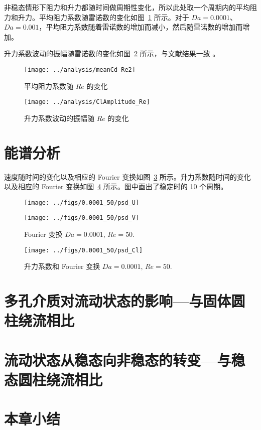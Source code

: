 非稳态情形下阻力和升力都随时间做周期性变化，所以此处取一个周期内的平均阻力和升力。平均阻力系数随雷诺数的变化如图~\ref{fig: meanCd} 所示。对于 $Da=0.0001$、$Da=0.001$，平均阻力系数随着雷诺数的增加而减小，然后随雷诺数的增加而增加。

升力系数波动的振幅随雷诺数的变化如图~\ref{fig: ClAmplitude} 所示，与文献结果一致 \cite{Park1998}。

\begin{figure}
	\centering
	\texttt{[image: ../analysis/meanCd\_Re2]}
	\caption{平均阻力系数随 $Re$ 的变化}
	\label{fig: meanCd}
\end{figure}

\begin{figure}
	\centering
	\texttt{[image: ../analysis/ClAmplitude\_Re]}
	\caption{升力系数波动的振幅随 $Re$ 的变化}
	\label{fig: ClAmplitude}
\end{figure}

\section{能谱分析} %

速度随时间的变化以及相应的 Fourier 变换如图~\ref{fig: velocity Fourier} 所示。升力系数随时间的变化以及相应的 Fourier 变换如图~\ref{fig: Cl Fourier} 所示。图中画出了稳定时的 10 个周期。

\begin{figure}
	\centering
	\begin{minipage}{\textwidth}
		\centering
		\texttt{[image: ../figs/0.0001\_50/psd\_U]}
	\end{minipage}
	\centering
	\begin{minipage}{\textwidth}
		\centering
		\texttt{[image: ../figs/0.0001\_50/psd\_V]}
	\end{minipage}
	\caption{Fourier 变换 $Da=0.0001$, $Re=50$.}
	\label{fig: velocity Fourier}
\end{figure}

\begin{figure}
	\centering
	\texttt{[image: ../figs/0.0001\_50/psd\_Cl]}
	\caption{升力系数和 Fourier 变换 $Da=0.0001$, $Re=50$.}
	\label{fig: Cl Fourier}
\end{figure}

\section{多孔介质对流动状态的影响---与固体圆柱绕流相比}

\section{流动状态从稳态向非稳态的转变---与稳态圆柱绕流相比}

\section{本章小结}
